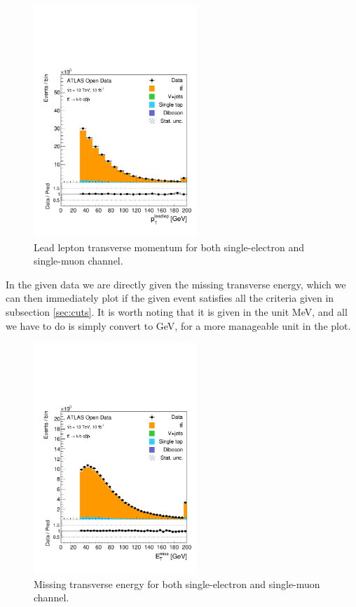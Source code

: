 \documentclass[12pt,a4paper]{article}
\begin{document}
\begin{figure}[H]
  \centering
  \includegraphics[width=0.55\textwidth]{figures/hist_leadleptpt}
  \caption{\label{fig:leppt}Lead lepton transverse momentum for both single-electron and single-muon channel.}
\end{figure}


In the given data we are directly given the missing transverse energy, which we
can then immediately plot if the given event satisfies all the criteria given in
subsection \ref{sec:cuts}. It is worth noting that it is given in the unit MeV, and all we have
to do is simply convert to GeV, for a more manageable unit in the plot.
\begin{figure}[H]
  \centering
  \includegraphics[width=0.55\textwidth]{figures/hist_etmiss}
  \caption{\label{fig:etmiss}Missing transverse energy for both single-electron and single-muon channel.}
\end{figure}
\end{document}
